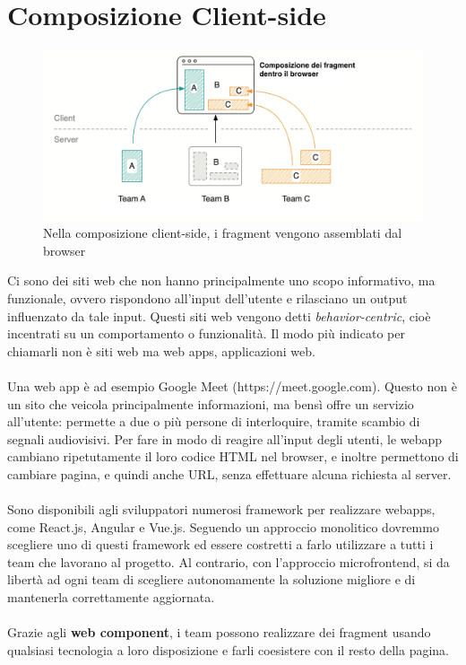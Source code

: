 \section{Composizione Client-side}
\begin{figure}[H]
    \centering
    \includegraphics[width=140mm]{img/clientside}
    \caption{Nella composizione client-side, i fragment vengono assemblati dal browser}
  \end{figure}
Ci sono dei siti web che non hanno principalmente uno scopo informativo, ma funzionale, ovvero rispondono all'input dell'utente
e rilasciano un output influenzato da tale input. Questi siti web vengono detti \emph{behavior-centric}, cioè 
incentrati su un comportamento o funzionalità.
Il modo più indicato per chiamarli non è siti web ma web apps, applicazioni web.
\\\\
Una web app è ad esempio Google Meet (https://meet.google.com).
Questo non è un sito che veicola principalmente informazioni, ma bensì offre un servizio all'utente: permette a due o più persone di 
interloquire, tramite scambio di segnali audiovisivi. Per fare in modo di reagire
all'input degli utenti, le webapp cambiano ripetutamente il loro codice HTML nel browser, e inoltre permettono 
di cambiare pagina, e quindi anche URL, senza effettuare alcuna richiesta al server.
\\\\
Sono disponibili agli sviluppatori numerosi framework per realizzare webapps, come React.js, Angular e Vue.js.
Seguendo un approccio monolitico dovremmo scegliere uno di questi framework ed essere costretti a farlo utilizzare
a tutti i team che lavorano al progetto. Al contrario, con l'approccio microfrontend, si da libertà ad ogni team
di scegliere autonomamente la soluzione migliore e di mantenerla correttamente aggiornata.
\\\\
Grazie agli \textbf{web component}, i team possono realizzare dei fragment usando qualsiasi tecnologia a loro disposizione e 
farli coesistere con il resto della pagina.



